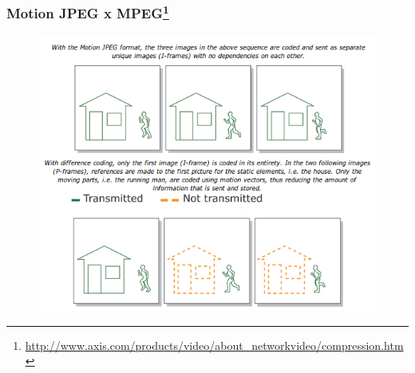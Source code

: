 \documentclass[]{beamer}
\begin{document}
\begin{frame}
 \frametitle{Motion JPEG x 
MPEG\footnote{\url{http://www.axis.com/products/video/about_networkvideo/compression.htm}}}
  \begin{figure}[hbtp]
  \begin{center}
   \includegraphics[scale=0.28]{mpeg_x_motionjpeg.png}
  \end{center}
  \end{figure}
\end{frame}
\end{document}
